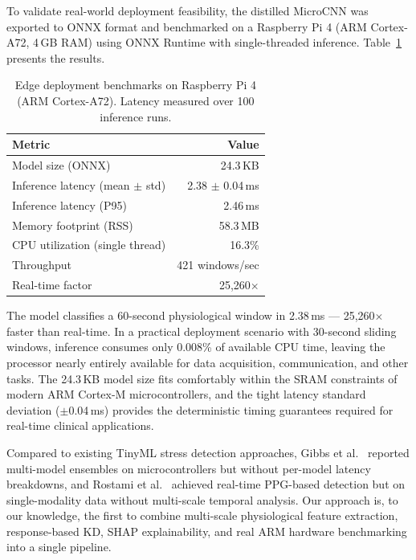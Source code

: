\documentclass[conference]{IEEEtran}
\begin{document}
To validate real-world deployment feasibility, the distilled MicroCNN was exported to ONNX format and benchmarked on a Raspberry Pi 4 (ARM Cortex-A72, 4\,GB RAM) using ONNX Runtime with single-threaded inference. Table~\ref{tab:edge} presents the results.

\begin{table}[t]
\centering
\caption{Edge deployment benchmarks on Raspberry Pi 4 (ARM Cortex-A72). Latency measured over 100 inference runs.}
\label{tab:edge}
\begin{tabular}{lr}
\toprule
Metric & Value \\
\midrule
Model size (ONNX) & 24.3\,KB \\
Inference latency (mean $\pm$ std) & 2.38 $\pm$ 0.04\,ms \\
Inference latency (P95) & 2.46\,ms \\
Memory footprint (RSS) & 58.3\,MB \\
CPU utilization (single thread) & 16.3\% \\
Throughput & 421 windows/sec \\
Real-time factor & 25,260$\times$ \\
\bottomrule
\end{tabular}
\end{table}

The model classifies a 60-second physiological window in 2.38\,ms --- 25,260$\times$ faster than real-time. In a practical deployment scenario with 30-second sliding windows, inference consumes only 0.008\% of available CPU time, leaving the processor nearly entirely available for data acquisition, communication, and other tasks. The 24.3\,KB model size fits comfortably within the SRAM constraints of modern ARM Cortex-M microcontrollers, and the tight latency standard deviation ($\pm$0.04\,ms) provides the deterministic timing guarantees required for real-time clinical applications.

Compared to existing TinyML stress detection approaches, Gibbs et al.~\cite{gibbs2023combining} reported multi-model ensembles on microcontrollers but without per-model latency breakdowns, and Rostami et al.~\cite{rostami2025real} achieved real-time PPG-based detection but on single-modality data without multi-scale temporal analysis. Our approach is, to our knowledge, the first to combine multi-scale physiological feature extraction, response-based KD, SHAP explainability, and real ARM hardware benchmarking into a single pipeline.

\end{document}
